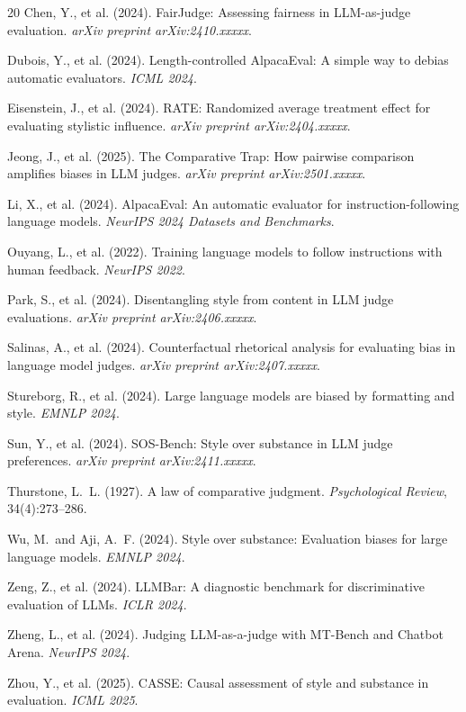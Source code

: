 \documentclass[11pt]{article}
\begin{document}
\begin{thebibliography}{20}
Chen, Y., et al. (2024).
FairJudge: Assessing fairness in LLM-as-judge evaluation.
\emph{arXiv preprint arXiv:2410.xxxxx}.

Dubois, Y., et al. (2024).
Length-controlled AlpacaEval: A simple way to debias automatic evaluators.
\emph{ICML 2024}.

Eisenstein, J., et al. (2024).
RATE: Randomized average treatment effect for evaluating stylistic influence.
\emph{arXiv preprint arXiv:2404.xxxxx}.

Jeong, J., et al. (2025).
The Comparative Trap: How pairwise comparison amplifies biases in LLM judges.
\emph{arXiv preprint arXiv:2501.xxxxx}.

Li, X., et al. (2024).
AlpacaEval: An automatic evaluator for instruction-following language models.
\emph{NeurIPS 2024 Datasets and Benchmarks}.

Ouyang, L., et al. (2022).
Training language models to follow instructions with human feedback.
\emph{NeurIPS 2022}.

Park, S., et al. (2024).
Disentangling style from content in LLM judge evaluations.
\emph{arXiv preprint arXiv:2406.xxxxx}.

Salinas, A., et al. (2024).
Counterfactual rhetorical analysis for evaluating bias in language model judges.
\emph{arXiv preprint arXiv:2407.xxxxx}.

Stureborg, R., et al. (2024).
Large language models are biased by formatting and style.
\emph{EMNLP 2024}.

Sun, Y., et al. (2024).
SOS-Bench: Style over substance in LLM judge preferences.
\emph{arXiv preprint arXiv:2411.xxxxx}.

Thurstone, L.~L. (1927).
A law of comparative judgment.
\emph{Psychological Review}, 34(4):273--286.

Wu, M.\ and Aji, A.~F. (2024).
Style over substance: Evaluation biases for large language models.
\emph{EMNLP 2024}.

Zeng, Z., et al. (2024).
LLMBar: A diagnostic benchmark for discriminative evaluation of LLMs.
\emph{ICLR 2024}.

Zheng, L., et al. (2024).
Judging LLM-as-a-judge with MT-Bench and Chatbot Arena.
\emph{NeurIPS 2024}.

Zhou, Y., et al. (2025).
CASSE: Causal assessment of style and substance in evaluation.
\emph{ICML 2025}.
\end{thebibliography}
\end{document}
